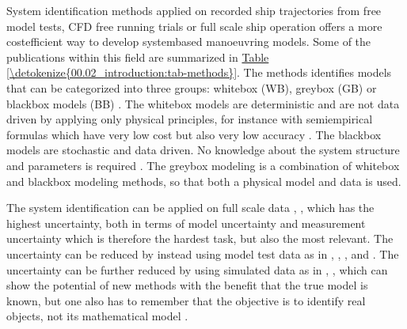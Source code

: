 \documentclass[review]{elsarticle}
\begin{document}
\sphinxAtStartPar
System identification methods applied on recorded ship trajectories from free model tests, CFD free running trials \cite{araki_estimating_2012} or full scale ship operation offers a more cost\sphinxhyphen{}efficient way to develop system\sphinxhyphen{}based manoeuvring models.
Some of the publications within this field are summarized in \hyperref[\detokenize{00.02_introduction:tab-methods}]{Table \ref{\detokenize{00.02_introduction:tab-methods}}}. The methods identifies models that can be categorized into three groups: white\sphinxhyphen{}box (WB), grey\sphinxhyphen{}box (GB) or black\sphinxhyphen{}box models (BB) \cite{miller_ship_2021}. The white\sphinxhyphen{}box models are deterministic and are not data driven by applying only physical principles, for instance with semi\sphinxhyphen{}empirical formulas which have very low cost but also very low accuracy \cite{ittc_maneuvering_2008}. The black\sphinxhyphen{}box models are stochastic and data driven. No knowledge about the system structure and parameters is required \cite{miller_ship_2021}. The grey\sphinxhyphen{}box modeling is a combination of white\sphinxhyphen{}box and black\sphinxhyphen{}box modeling methods, so that both a physical model and data is used.

\sphinxAtStartPar
The system identification can be applied on full scale data \cite{astrom_identification_1976}, \cite{perera_system_2015}, \cite{revestido_herrero_two-step_2012} which has the highest uncertainty, both in terms of model uncertainty and measurement uncertainty which is therefore the hardest task, but also the most relevant. The uncertainty can be reduced by instead using model test data as in \cite{araki_estimating_2012}, \cite{he_nonparametric_2022}, \cite{xue_identification_2021}, \cite{miller_ship_2021} and \cite{luo_parameter_2016} . The uncertainty can be further reduced by using simulated data as in \cite{shi_identification_2009}, \cite{zhu_parameter_2017}, \cite{wang_parameter_2021} which can show the potential of new methods with the benefit that the true model is known, but one also has to remember that the objective is to identify real objects, not its mathematical model \cite{miller_ship_2021}.
\end{document}
